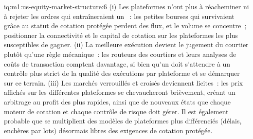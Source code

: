 \begin{solution}{iq:m1:us-equity-market-structure:6}
(i) Les plateformes n'ont plus à réacheminer ni à rejeter les ordres qui entraîneraient un
~: les petites bourses qui survivaient grâce au statut de cotation protégée perdent des flux,
et le volume se concentre~; positionner la connectivité et le capital de cotation sur les
plateformes les plus susceptibles de gagner. (ii) La meilleure exécution devient le jugement du courtier
plutôt qu'une règle mécanique~: les routeurs des courtiers et leurs analyses de coûts de transaction
comptent davantage, si bien qu'un  doit s'attendre à un contrôle plus strict de la qualité des exécutions
par plateforme et se démarquer sur ce terrain. (iii) Les marchés verrouillés et croisés deviennent
licites~: les prix affichés sur les différentes plateformes se chevaucheront brièvement, créant
un arbitrage au profit des plus rapides, ainsi que de nouveaux états que chaque moteur de cotation et chaque contrôle de risque
doit gérer. Il est également probable que se multiplient des modèles de plateformes plus différenciés (délais,
enchères par lots) désormais libres des exigences de cotation protégée.
\end{solution}
